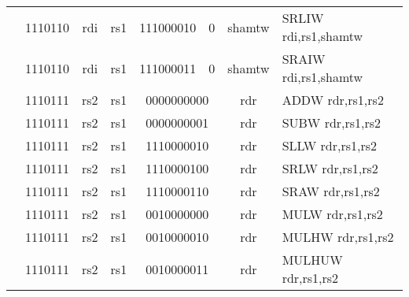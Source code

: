 \begin{table}[p]
\begin{small}
\begin{center}
\begin{tabular}{rcccccccccccl}
&
\multicolumn{2}{|c|}{1110110} &
\multicolumn{1}{c|}{rdi} &
\multicolumn{1}{c|}{rs1} &
\multicolumn{5}{c|}{111000010} &
\multicolumn{1}{c|}{0} &
\multicolumn{1}{c|}{shamtw} & SRLIW rdi,rs1,shamtw \\
\cline{2-12}
  

&
\multicolumn{2}{|c|}{1110110} &
\multicolumn{1}{c|}{rdi} &
\multicolumn{1}{c|}{rs1} &
\multicolumn{5}{c|}{111000011} &
\multicolumn{1}{c|}{0} &
\multicolumn{1}{c|}{shamtw} & SRAIW rdi,rs1,shamtw \\
\cline{2-12}
  

&
\multicolumn{2}{|c|}{1110111} &
\multicolumn{1}{c|}{rs2} &
\multicolumn{1}{c|}{rs1} &
\multicolumn{6}{c|}{0000000000} &
\multicolumn{1}{c|}{rdr} & ADDW rdr,rs1,rs2 \\
\cline{2-12}
  

&
\multicolumn{2}{|c|}{1110111} &
\multicolumn{1}{c|}{rs2} &
\multicolumn{1}{c|}{rs1} &
\multicolumn{6}{c|}{0000000001} &
\multicolumn{1}{c|}{rdr} & SUBW rdr,rs1,rs2 \\
\cline{2-12}
  

&
\multicolumn{2}{|c|}{1110111} &
\multicolumn{1}{c|}{rs2} &
\multicolumn{1}{c|}{rs1} &
\multicolumn{6}{c|}{1110000010} &
\multicolumn{1}{c|}{rdr} & SLLW rdr,rs1,rs2 \\
\cline{2-12}
  

&
\multicolumn{2}{|c|}{1110111} &
\multicolumn{1}{c|}{rs2} &
\multicolumn{1}{c|}{rs1} &
\multicolumn{6}{c|}{1110000100} &
\multicolumn{1}{c|}{rdr} & SRLW rdr,rs1,rs2 \\
\cline{2-12}
  

&
\multicolumn{2}{|c|}{1110111} &
\multicolumn{1}{c|}{rs2} &
\multicolumn{1}{c|}{rs1} &
\multicolumn{6}{c|}{1110000110} &
\multicolumn{1}{c|}{rdr} & SRAW rdr,rs1,rs2 \\
\cline{2-12}
  

&
\multicolumn{2}{|c|}{1110111} &
\multicolumn{1}{c|}{rs2} &
\multicolumn{1}{c|}{rs1} &
\multicolumn{6}{c|}{0010000000} &
\multicolumn{1}{c|}{rdr} & MULW rdr,rs1,rs2 \\
\cline{2-12}
  

&
\multicolumn{2}{|c|}{1110111} &
\multicolumn{1}{c|}{rs2} &
\multicolumn{1}{c|}{rs1} &
\multicolumn{6}{c|}{0010000010} &
\multicolumn{1}{c|}{rdr} & MULHW rdr,rs1,rs2 \\
\cline{2-12}
  

&
\multicolumn{2}{|c|}{1110111} &
\multicolumn{1}{c|}{rs2} &
\multicolumn{1}{c|}{rs1} &
\multicolumn{6}{c|}{0010000011} &
\multicolumn{1}{c|}{rdr} & MULHUW rdr,rs1,rs2 \\
\cline{2-12}
  


\end{tabular}
\end{center}
\end{small}
\end{table}
